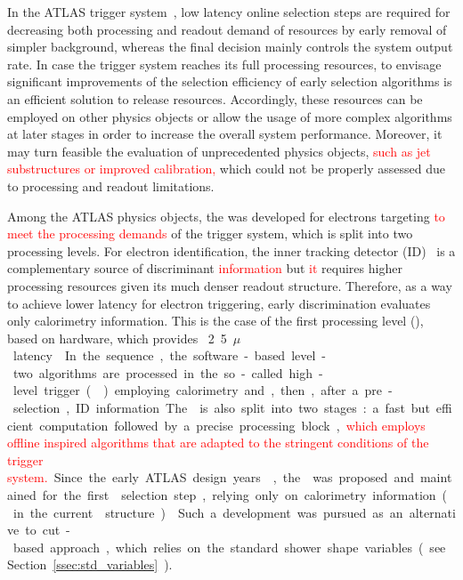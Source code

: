 In the ATLAS trigger system~\cite{TRIG-2016-01}, low latency online selection
steps are required for decreasing both processing and readout demand of
resources by early removal of simpler background, whereas the final decision
mainly controls the system output rate. In case the trigger system reaches its
full processing resources, to envisage significant improvements of the selection
efficiency of early selection algorithms is an efficient solution to release
resources. Accordingly, these resources can be employed on other physics
objects or allow the usage of more complex algorithms at later stages in order
to increase the overall system performance. Moreover, it may turn feasible the
evaluation of unprecedented physics objects, \textcolor{red}{such as jet substructures or improved calibration,} which could not be properly
assessed due to processing and readout limitations.


Among the ATLAS physics objects, the \rnn{} was developed for electrons targeting \textcolor{red}{to meet the processing demands} of the trigger system, which is split into two processing levels.  For electron identification, the inner tracking detector (ID)~\cite{PERF-2007-01} is a complementary source of discriminant \textcolor{red}{information} but \textcolor{red}{it} requires higher processing resources given its much denser readout structure.  Therefore, as a way to achieve lower latency for electron triggering, early discrimination evaluates only calorimetry information. This is the case of the first processing level (\licalo), based on hardware, which provides \SI{}2.5{$\mu$} latency~\cite{TRIG-2016-01}. In the sequence, the software-based level-two algorithms are processed in the so-called high-level trigger (\hlt{}) employing calorimetry and, then, after a pre-selection, ID information.  
The \hlt{} is also split into two stages: a fast but efficient computation followed by a precise processing block, \textcolor{red}{which employs offline inspired algorithms that are adapted to the stringent conditions of the trigger system.} Since the early ATLAS design years~\cite{1995_seixas_ringer}, the \rnn{} was proposed and maintained for the first \hlt{} selection step, relying only on calorimetry information (\fastcalo{} in the current \hlt{} structure)~\cite{TRIG-2016-01}.  Such a development was pursued as an alternative to cut-based approach, which relies on the standard shower shape variables (see Section~\ref{ssec:std_variables}).


